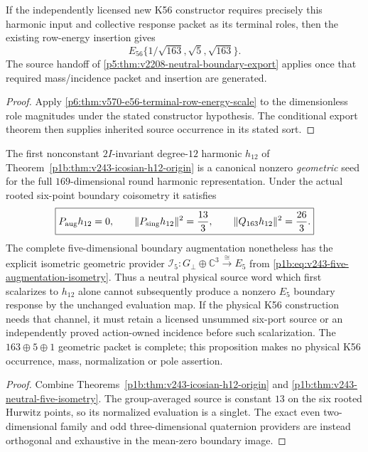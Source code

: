 \documentclass[12pt,a4paper]{article}
\begin{document}
\begin{corollary}
\label{p6:cor:v2208-conditional-rank-energies}
If the independently licensed new K56 constructor requires precisely this
harmonic input and collective response packet as its terminal roles, then
the existing row-energy insertion gives
\[
 \boxed{E_{56}\{1/\sqrt{163},\sqrt5,\sqrt{163}\}.}
\]
The source handoff of \ref{p5:thm:v2208-neutral-boundary-export} applies
once that required mass/incidence packet and insertion are generated.
\end{corollary}
\begin{proof}
Apply \ref{p6:thm:v570-e56-terminal-row-energy-scale} to the dimensionless
role magnitudes under the stated constructor hypothesis. The conditional
export theorem then supplies inherited source occurrence in its stated sort.
\end{proof}
\begin{proposition}
\label{p6:prop:v243-neutral-icosian-owner-test}
The first nonconstant $2I$-invariant degree-$12$ harmonic
$h_{12}$ of Theorem~\ref{p1b:thm:v243-icosian-h12-origin} is a
canonical nonzero \emph{geometric} seed for the full
$169$-dimensional round harmonic representation.  Under the actual
rooted six-point boundary coisometry it satisfies
\[
 \boxed{P_{\rm aug}h_{12}=0,\qquad
 \|P_{\rm sing}h_{12}\|^2=\frac{13}{3},\qquad
 \|Q_{163}h_{12}\|^2=\frac{26}{3}.}
\]
The complete five-dimensional boundary augmentation nonetheless has
the explicit isometric geometric provider
$\mathcal I_5:G_\perp\oplus\mathbb C^3\xrightarrow{\cong}E_5$
from \eqref{p1b:eq:v243-five-augmentation-isometry}.  Thus a
neutral physical source word which first scalarizes to $h_{12}$
alone cannot subsequently produce a nonzero $E_5$ boundary
response by the unchanged evaluation map.  If the physical K56
construction needs that channel, it must retain a licensed
unsummed six-port source or an independently proved action-owned
incidence before such scalarization.  The $163\oplus5\oplus1$
geometric packet is complete; this proposition makes no
physical K56 occurrence, mass, normalization or pole assertion.
\end{proposition}
\begin{proof}
Combine Theorems~\ref{p1b:thm:v243-icosian-h12-origin} and
\ref{p1b:thm:v243-neutral-five-isometry}.  The group-averaged
source is constant $13$ on the six rooted Hurwitz points, so its
normalized evaluation is a singlet.  The exact even two-dimensional
family and odd three-dimensional quaternion providers are instead
orthogonal and exhaustive in the mean-zero boundary image.
\end{proof}
\end{document}
